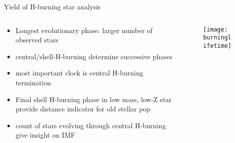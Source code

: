 \begin{frame}{Yield of H-burning star analysis}
    \begin{columns}[T]
        \begin{column}{0.5\textwidth}
    \begin{itemize}
\item Longest evolutionary phase: larger number of observed stars
\item central/shell-H-burning determine successive phases
\item most important clock is central H-burning termination
\item Final shell H-burning phase in low mass, low-Z star provide distance indicator for old stellar pop
\item count of stars evolving through central H-burning give insight on IMF
\end{itemize}
        \end{column}
        \begin{column}{0.5\textwidth}
            \begin{figure}[!ht]\texttt{[image: burninglifetime]}
			\end{figure}
        \end{column}
    \end{columns}
    
\end{frame}


